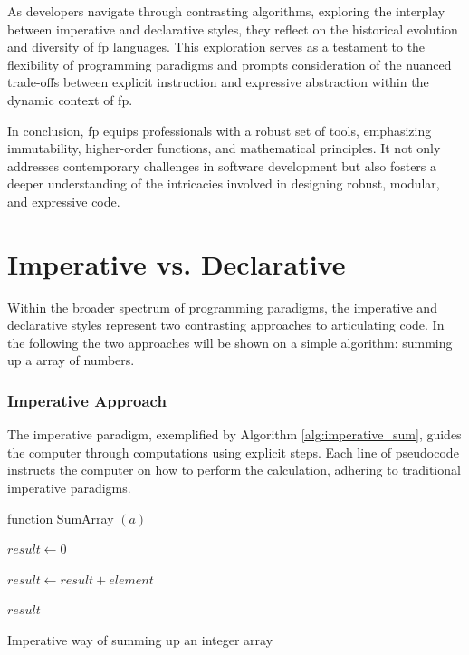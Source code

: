     As developers navigate through contrasting algorithms, exploring the interplay between imperative and declarative styles, they reflect on the historical evolution and diversity of \ac{fp} languages. This exploration serves as a testament to the flexibility of programming paradigms and prompts consideration of the nuanced trade-offs between explicit instruction and expressive abstraction within the dynamic context of \ac{fp}.
    
    In conclusion, \ac{fp} equips professionals with a robust set of tools, emphasizing immutability, higher-order functions, and mathematical principles. It not only addresses contemporary challenges in software development but also fosters a deeper understanding of the intricacies involved in designing robust, modular, and expressive code.
    

\section{Imperative vs. Declarative}

Within the broader spectrum of programming paradigms, the imperative and declarative styles represent two contrasting approaches to articulating code. In the following the two approaches will be shown on a simple algorithm: summing up a array of numbers.

\subsubsection{Imperative Approach}

The imperative paradigm, exemplified by Algorithm \ref{alg:imperative_sum}, guides the computer through computations using explicit steps. Each line of pseudocode instructs the computer on how to perform the calculation, adhering to traditional imperative paradigms.

\begin{algorithm}

    \underline{function SumArray} $(a)$\;
    
    \BlankLine
    $result \leftarrow 0$
    
    {
        $result \leftarrow result + element$
    }
    
    \Return $result$
    
    \caption{Imperative way of summing up an integer array}
    \label{alg:imperative_sum}
\end{algorithm}

